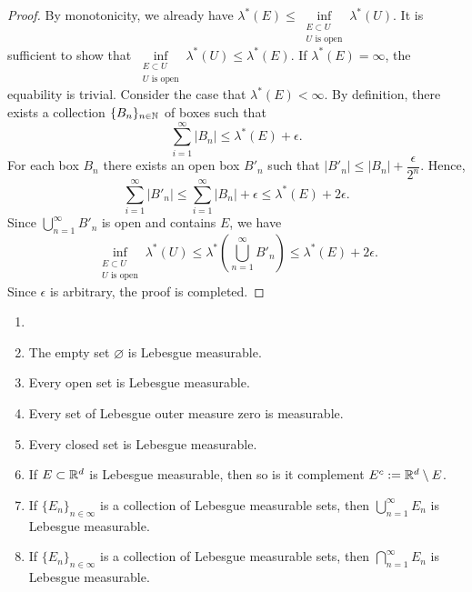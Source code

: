 \begin{proof}
  By monotonicity, we already have $\lambda^*(E) \le \inf\limits_{\substack{E \subset U \\ U \text{ is open}}} \lambda^*(U)$. It is sufficient to show that $\inf\limits_{\substack{E \subset U \\ U \text{ is open}}} \lambda^*(U)\le \lambda^*(E)$. If $\lambda^*(E) = \infty$, the equability is trivial. Consider the case that $\lambda^*(E) < \infty$. By definition, there exists a collection $\{B_n\}_{n\in\mathbb{N}}$ of boxes such that
  $$\sum\limits_{i=1}^\infty |B_n| \le \lambda^*(E) + \epsilon.$$
  For each box $B_n$ there exists an open box $B'_n$ such that $|B'_n|\le |B_n| + \dfrac{\epsilon}{2^n}$. Hence,
  $$\sum\limits_{i=1}^\infty |B'_n| \le \sum\limits_{i=1}^\infty |B_n| + \epsilon \le \lambda^*(E) + 2\epsilon.$$
  Since $\bigcup\limits_{n=1}^\infty B'_n$ is open and contains $E$, we have
  $$\inf\limits_{\substack{E \subset U \\ U \text{ is open}}} \lambda^*(U)\le\lambda^*\left(\bigcup\limits_{n=1}^\infty B'_n\right) \le \lambda^*(E) + 2\epsilon.$$
  Since $\epsilon$ is arbitrary, the proof is completed.
\end{proof}

\begin{proposition}
  \label{proposition-lebesgue-measurable-sets}
  \begin{enumerate}[label=(\arabic*)]
    \item []
    \item The empty set $\varnothing$ is Lebesgue measurable.
    \item Every open set is Lebesgue measurable.
    \item Every set of Lebesgue outer measure zero is measurable.
    \item Every closed set is Lebesgue measurable.
    \item If $E\subset\mathbb{R}^d$ is Lebesgue measurable, then so is it complement $E^c := \mathbb{R}^d\setminus E$.
    \item If $\{E_n\}_{n\in\infty}$ is a collection of Lebesgue measurable sets, then $\bigcup\limits_{n=1}^\infty E_n$ is Lebesgue measurable.
    \item If $\{E_n\}_{n\in\infty}$ is a collection of Lebesgue measurable sets, then $\bigcap\limits_{n=1}^\infty E_n$ is Lebesgue measurable.
  \end{enumerate}
\end{proposition}


